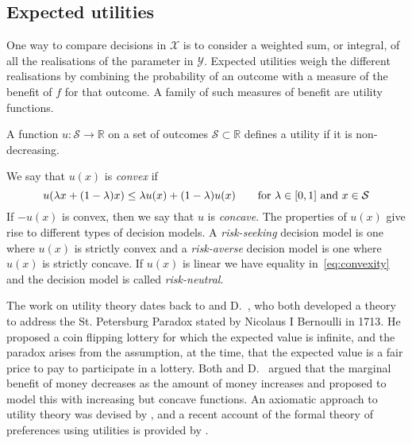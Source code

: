 \documentclass[main.tex]{subfiles}
\begin{document}
\subsection{Expected utilities}
One way to compare decisions in $\mathcal{X}$ is to consider a weighted
sum, or integral, of all the realisations of the parameter in $\mathcal{Y}$.
Expected utilities weigh the different realisations by combining the
probability of an outcome with a measure of the benefit of $f$ for that
outcome.
A family of such measures of benefit are utility functions.
\begin{mydef}
  A function $u:\mathcal{S}\to\mathbb{R}$ on a set of outcomes
  $\mathcal{S}\subset \mathbb{R}$ defines a utility if
  it is non-decreasing.
\end{mydef}

\begin{mydef}[Convexity]
  We say that $u(x)$ is \emph{convex} if
  \begin{equation}\label{eq:convexity}
    u(\lambda x + (1-\lambda)x)\leq
    \lambda u(x) + (1-\lambda) u(x)\qquad \textnormal{for $\lambda\in[0,1]$ and
      $x\in\mathcal{S}$}
  \end{equation}
  If $-u(x)$ is convex, then we say that $u$ is
  \emph{concave}.
  The properties of $u(x)$ give rise to different types of decision models.
  A \emph{risk-seeking} decision model is one where $u(x)$
  is strictly convex and a \emph{risk-averse} decision model is one where
  $u(x)$ is strictly concave.
  If $u(x)$ is linear we have equality in~\eqref{eq:convexity} and
  the decision model is called \emph{risk-neutral}.
\end{mydef}

The work on utility theory dates back to \citet{cramer1728utility} and
D.~\citet{bernoulli1738specimen}, who both developed a theory
to address the St. Petersburg Paradox stated by Nicolaus I Bernoulli
in 1713. He proposed a coin flipping lottery for which the
expected value is infinite, and the paradox arises from the
assumption, at the time, that the expected value is a fair price to
pay to participate in a lottery.
Both \citeauthor{cramer1728utility} and
D.~\citeauthor{bernoulli1738specimen} argued that the marginal benefit
of money decreases as the amount of money increases and proposed to
model this with increasing but concave functions.
An axiomatic approach to utility theory was devised by
\citet{neumann1953theory}, and
a recent account of the formal theory of preferences using utilities
is provided by \citet[Ch.~2]{follmer2004stochastic}.
\end{document}
